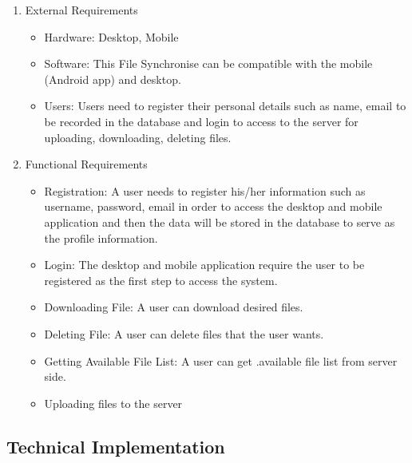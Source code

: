 \documentclass[11pt]{article}
\begin{document}
\begin{enumerate}
   \item External Requirements
   \begin{itemize}
     \item Hardware: Desktop, Mobile 
     \item Software: This File Synchronise can be compatible with the mobile (Android app) and desktop.
     \item Users: Users need to register their personal details such as name, email to be recorded in the database and login to access to the server for uploading, downloading, deleting files.
   \end{itemize}
   \item Functional Requirements
   \begin{itemize}
     \item Registration: A user needs to register his/her information such as username, password, email in order to access the desktop and mobile application and then the data will be stored in the database to serve as the profile information.
     \item Login: The desktop and mobile application require the user to be registered as the first step to access the system.
     \item Downloading File: A user can download desired files.
     \item Deleting File: A user can delete files that the user wants.
     \item Getting Available File List: A user can get .available file list from server side.
     \item Uploading files to the server
   \end{itemize}
\end{enumerate}


\subsection{Technical Implementation}
\end{document}
